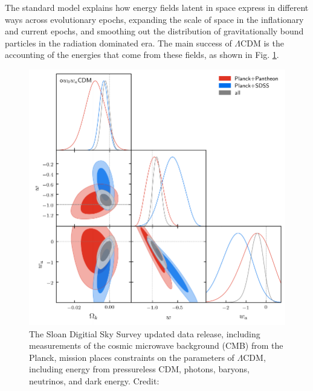 \documentclass{paper}
\begin{document}

   The standard model explains how energy fields latent in space express in 
   different ways across evolutionary epochs, expanding the scale of 
   space in the inflationary and current epochs, and smoothing out the 
   distribution of gravitationally bound particles in the radiation dominated 
   era. The main success of $\Lambda$CDM is the accounting of the energies
   that come from these fields, as shown in Fig. \ref{fig:Intro-constraints}. 

  \begin{figure}[H]
    \begin{centering}
    \includegraphics[scale=0.7]{Intro-constraints.pdf}
    \caption{The Sloan Digitial Sky Survey updated data release, including 
      measurements of the cosmic microwave background (CMB) from the Planck,
      mission places constraints on the parameters of $\Lambda$CDM, including
      energy from pressureless CDM, photons, baryons, neutrinos, and dark
      energy.
    Credit: \cite{2021PhRvD.103h3533A}}
    \label{fig:Intro-constraints}
    \end{centering}
  \end{figure}
\end{document}
